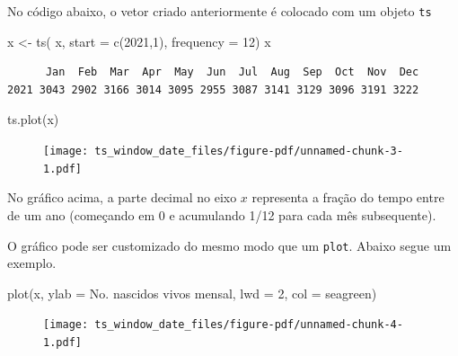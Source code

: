 \documentclass[
  letterpaper,
  DIV=11,
  numbers=noendperiod]{scrreprt}
\newenvironment{Shaded}{\begin{snugshade}}{\end{snugshade}}
\newcommand{\AttributeTok}[1]{\textcolor[rgb]{0.40,0.45,0.13}{#1}}
\newcommand{\DecValTok}[1]{\textcolor[rgb]{0.68,0.00,0.00}{#1}}
\newcommand{\FunctionTok}[1]{\textcolor[rgb]{0.28,0.35,0.67}{#1}}
\newcommand{\NormalTok}[1]{\textcolor[rgb]{0.00,0.23,0.31}{#1}}
\newcommand{\OtherTok}[1]{\textcolor[rgb]{0.00,0.23,0.31}{#1}}
\newcommand{\StringTok}[1]{\textcolor[rgb]{0.13,0.47,0.30}{#1}}
\theoremstyle{plain}
\theoremstyle{definition}
\theoremstyle{definition}
\theoremstyle{remark}
\begin{document}
No código abaixo, o vetor criado anteriormente é colocado com um objeto
\texttt{ts}

\begin{Shaded}
\begin{Highlighting}[]
\NormalTok{x }\OtherTok{\textless{}{-}} \FunctionTok{ts}\NormalTok{( x, }\AttributeTok{start =} \FunctionTok{c}\NormalTok{(}\DecValTok{2021}\NormalTok{,}\DecValTok{1}\NormalTok{), }\AttributeTok{frequency =} \DecValTok{12}\NormalTok{)}
\NormalTok{x}
\end{Highlighting}
\end{Shaded}

\begin{verbatim}
      Jan  Feb  Mar  Apr  May  Jun  Jul  Aug  Sep  Oct  Nov  Dec
2021 3043 2902 3166 3014 3095 2955 3087 3141 3129 3096 3191 3222
\end{verbatim}

\begin{Shaded}
\begin{Highlighting}[]
\FunctionTok{ts.plot}\NormalTok{(x)}
\end{Highlighting}
\end{Shaded}

\begin{figure}[H]

{\centering \texttt{[image: ts\_window\_date\_files/figure-pdf/unnamed-chunk-3-1.pdf]}

}

\end{figure}

No gráfico acima, a parte decimal no eixo \(x\) representa a fração do
tempo entre de um ano (começando em 0 e acumulando 1/12 para cada mês
subsequente).

O gráfico pode ser customizado do mesmo modo que um \texttt{plot}.
Abaixo segue um exemplo.

\begin{Shaded}
\begin{Highlighting}[]
\FunctionTok{plot}\NormalTok{(x, }\AttributeTok{ylab =} \StringTok{\textquotesingle{}No. nascidos vivos mensal\textquotesingle{}}\NormalTok{, }\AttributeTok{lwd =} \DecValTok{2}\NormalTok{, }\AttributeTok{col =} \StringTok{\textquotesingle{}seagreen\textquotesingle{}}\NormalTok{)}
\end{Highlighting}
\end{Shaded}

\begin{figure}[H]

{\centering \texttt{[image: ts\_window\_date\_files/figure-pdf/unnamed-chunk-4-1.pdf]}

}

\end{figure}
\end{document}
